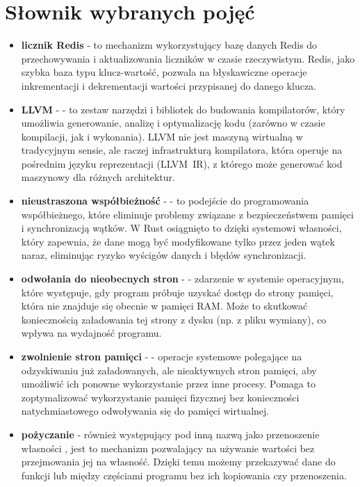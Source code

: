 \section{Słownik wybranych pojęć}

\begin{itemize}
    \item \textbf{licznik Redis} - to mechanizm wykorzystujący bazę danych Redis do przechowywania i aktualizowania liczników w czasie rzeczywistym. Redis, jako szybka baza typu klucz-wartość, pozwala na błyskawiczne operacje inkrementacji i dekrementacji wartości przypisanej do danego klucza.

    \item \textbf{LLVM} -  - to zestaw narzędzi i bibliotek do budowania kompilatorów, który umożliwia generowanie, analizę i optymalizację kodu (zarówno w czasie kompilacji, jak i wykonania). LLVM nie jest maszyną wirtualną w tradycyjnym sensie, ale raczej infrastrukturą kompilatora, która operuje na pośrednim języku reprezentacji \mbox{(LLVM IR)}, z którego może generować kod maszynowy dla różnych architektur.

    \item \textbf{nieustraszona współbieżność} -  - to podejście do programowania współbieżnego, które eliminuje problemy związane z bezpieczeństwem pamięci i synchronizacją wątków. W Rust osiągnięto to dzięki systemowi własności, który zapewnia, że dane mogą być modyfikowane tylko przez jeden wątek naraz, eliminując ryzyko wyścigów danych i błędów synchronizacji.

    \item \textbf{odwołania do nieobecnych stron} -  - zdarzenie w systemie operacyjnym, które występuje, gdy program próbuje uzyskać dostęp do strony pamięci, która nie znajduje się obecnie w pamięci RAM. Może to skutkować koniecznością załadowania tej strony z dysku (np. z pliku wymiany), co wpływa na wydajność programu.

    \item \textbf{zwolnienie stron pamięci} -  - operacje systemowe polegające na odzyskiwaniu już załadowanych, ale nieaktywnych stron pamięci, aby umożliwić ich ponowne wykorzystanie przez inne procesy. Pomaga to zoptymalizować wykorzystanie pamięci fizycznej bez konieczności natychmiastowego odwoływania się do pamięci wirtualnej.

    \item \textbf{pożyczanie}  - również występujący pod inną nazwą jako przenoszenie własności \cite{rustPolishNames}, jest to mechanizm pozwalający na używanie wartości bez przejmowania jej na własność. Dzięki temu możemy przekazywać dane do funkcji lub między częściami programu bez ich kopiowania czy przenoszenia.


\end{itemize}

